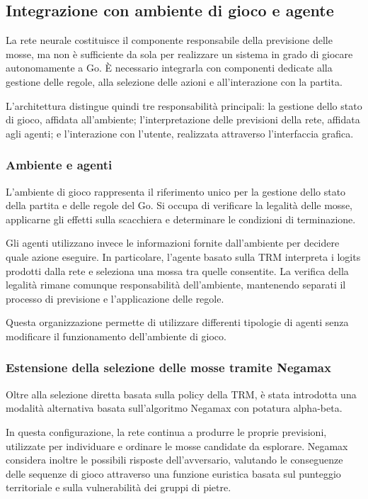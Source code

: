 \subsection{Integrazione con ambiente di gioco e agente}

La rete neurale costituisce il componente responsabile della previsione delle mosse, ma non è sufficiente da sola per realizzare un sistema in grado di giocare autonomamente a Go. È necessario integrarla con componenti dedicate alla gestione delle regole, alla selezione delle azioni e all'interazione con la partita.

L'architettura distingue quindi tre responsabilità principali: la gestione dello stato di gioco, affidata all'ambiente; l'interpretazione delle previsioni della rete, affidata agli agenti; e l'interazione con l'utente, realizzata attraverso l'interfaccia grafica.

\subsubsection{Ambiente e agenti}

L'ambiente di gioco rappresenta il riferimento unico per la gestione dello stato della partita e delle regole del Go. Si occupa di verificare la legalità delle mosse, applicarne gli effetti sulla scacchiera e determinare le condizioni di terminazione.

Gli agenti utilizzano invece le informazioni fornite dall'ambiente per decidere quale azione eseguire. In particolare, l'agente basato sulla TRM interpreta i logits prodotti dalla rete e seleziona una mossa tra quelle consentite. La verifica della legalità rimane comunque responsabilità dell'ambiente, mantenendo separati il processo di previsione e l'applicazione delle regole.

Questa organizzazione permette di utilizzare differenti tipologie di agenti senza modificare il funzionamento dell'ambiente di gioco.

\subsubsection{Estensione della selezione delle mosse tramite Negamax}

Oltre alla selezione diretta basata sulla policy della TRM, è stata introdotta una modalità alternativa basata sull'algoritmo Negamax con potatura alpha-beta.

In questa configurazione, la rete continua a produrre le proprie previsioni, utilizzate per individuare e ordinare le mosse candidate da esplorare. Negamax considera inoltre le possibili risposte dell'avversario, valutando le conseguenze delle sequenze di gioco attraverso una funzione euristica basata sul punteggio territoriale e sulla vulnerabilità dei gruppi di pietre.

